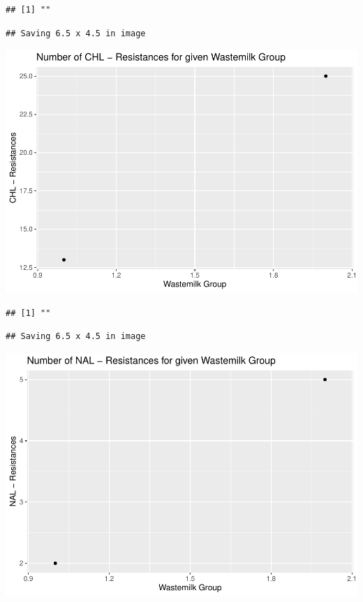 \documentclass[
]{article}
\begin{document}
\begin{verbatim}
## [1] ""
\end{verbatim}

\begin{verbatim}
## Saving 6.5 x 4.5 in image
\end{verbatim}

\includegraphics{NResistenzen_files/figure-latex/binary_or_nominal_variables-6.pdf}

\begin{verbatim}
## [1] ""
\end{verbatim}

\begin{verbatim}
## Saving 6.5 x 4.5 in image
\end{verbatim}

\includegraphics{NResistenzen_files/figure-latex/binary_or_nominal_variables-7.pdf}
\end{document}
